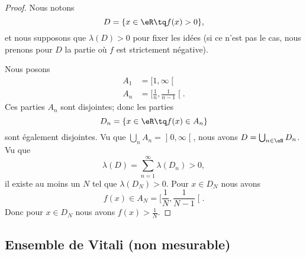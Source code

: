 \begin{proof}
	Nous notons
	\begin{equation}
		D=\{ x\in \eR\tq f(x)>0 \},
	\end{equation}
	et nous supposons que \( \lambda(D)>0\) pour fixer les idées (si ce n'est pas le cas, nous prenons pour \( D\) la partie où \( f\) est strictement négative).

	Nous posons
	\begin{subequations}
		\begin{align}
			A_1 & =\mathopen\lbrack 1 , \infty \mathclose\lbrack                       \\
			A_n & =\mathopen\lbrack \frac{1}{ n } , \frac{1}{ n-1 } \mathclose\lbrack.
		\end{align}
	\end{subequations}
	Ces parties \( A_n\) sont disjointes; donc les parties
	\begin{equation}
		D_n=\{ x\in \eR\tq f(x)\in A_n \}
	\end{equation}
	sont également disjointes. Vu que \( \bigcup_nA_n=\mathopen] 0 , \infty \mathclose[\), nous avons \( D=\bigcup_{n\in \eN}D_n\). Vu que
	\begin{equation}
		\lambda(D)=\sum_{n=1}^{\infty}\lambda(D_n)>0,
	\end{equation}
	il existe au moins un \( N\) tel que \( \lambda(D_N)>0\). Pour \( x\in D_N\) nous avons
	\begin{equation}
		f(x)\in A_N=\mathopen[ \frac{1}{ N } , \frac{1}{ N-1 } \mathclose[.
	\end{equation}
	Donc pour \( x\in D_N\) nous avons \( f(x)>\frac{1}{ N }\).
\end{proof}

\subsection{Ensemble de Vitali (non mesurable)}

